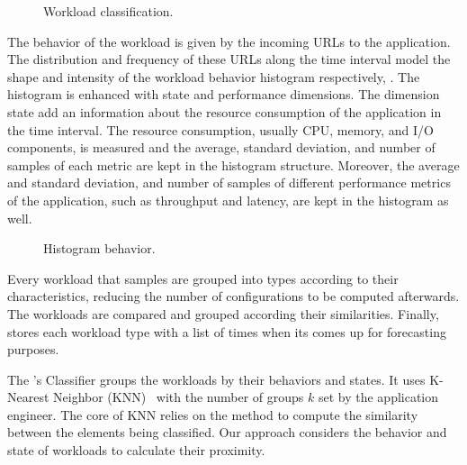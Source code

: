 \begin{figure*}[htp]
    \centering
    \def\svgwidth{\textwidth}
    \scalebox{1.0}{}
    \caption{Workload classification.}
    \label{fig:workload-classification}
\end{figure*}

The behavior of the workload is given by the incoming URLs to the application.
The distribution and frequency of these URLs along the time interval model the
shape and intensity of the workload behavior histogram respectively,
.  The histogram is enhanced with state and performance
dimensions. The dimension state add an information about the resource
consumption of the application in the time interval. The resource consumption,
usually CPU, memory, and I/O components, is measured and the average, standard
deviation, and number of samples of each metric are kept in the histogram
structure.  Moreover, the average and standard deviation, and number of samples
of different performance metrics of the application, such as throughput and
latency, are kept in the histogram as well.

\begin{figure*}[htp]
  \centering
  \def\svcwidth{\textwidth}
  \scalebox{1.0}{}
  \caption{Histogram behavior.}
  \label{fig:histogram}
\end{figure*}

Every workload that \name samples are grouped into types according to their
characteristics, reducing the number of configurations to be computed
afterwards. The workloads are compared and grouped according their similarities.
Finally, \name stores each workload type with a list of times when its comes up
for forecasting purposes.

The \name's Classifier groups the workloads by their behaviors and states. It
uses K-Nearest Neighbor (KNN)~\cite{?} with the number of groups $k$ set by the
application engineer. The core of KNN relies on the method to compute the
similarity between the elements being classified. Our approach considers the
behavior and state of workloads to calculate their proximity.


